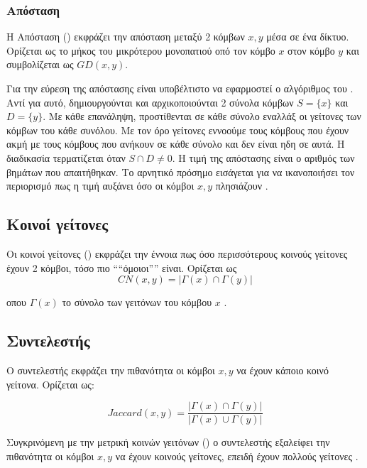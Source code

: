 \subsubsection{Απόσταση}

Η Απόσταση () εκφράζει την απόσταση μεταξύ 2 κόμβων \(x,y\) μέσα σε ένα δίκτυο.
Ορίζεται ως το μήκος του μικρότερου μονοπατιού οπό τον κόμβο
    $x$ στον κόμβο $y$ και συμβολίζεται ως $GD(x,y)$.

Για την εύρεση της απόστασης είναι υποβέλτιστο να εφαρμοστεί ο αλγόριθμος του 
 \cite{Dijkstra1959}.
Αντί για αυτό, δημιουργούνται και αρχικοποιούνται 2 σύνολα κόμβων \(S = \{x\}\) 
και \(D = \{y\}\). Με κάθε επανάληψη, προστίθενται σε κάθε σύνολο εναλλάξ οι γείτονες των 
κόμβων του κάθε συνόλου. Με τον όρο γείτονες εννοούμε τους κόμβους 
που έχουν ακμή με τους
κόμβους που ανήκουν σε κάθε σύνολο και δεν είναι ηδη σε αυτά. Η διαδικασία τερματίζεται 
όταν
\(S \cap D \neq 0\). Η τιμή της απόστασης είναι ο αριθμός των βημάτων που απαιτήθηκαν. Το
αρνητικό πρόσημο εισάγεται για να ικανοποιήσει τον περιορισμό πως η τιμή αυξάνει όσο οι 
κόμβοι \(x,y\) πλησιάζουν \cite{GraphDistance}.

\subsection{Κοινοί γείτονες}

Οι κοινοί γείτονες () εκφράζει την έννοια πως όσο περισσότερους κοινούς
γείτονες έχουν 2 κόμβοι, τόσο πιο ````όμοιοι'''' είναι. Ορίζεται ως
 \begin{equation}
     CN(x,y) = |\Gamma(x)\cap\Gamma(y)|
 \end{equation}

οπου \(\Gamma(x)\) το σύνολο των γειτόνων του κόμβου \(x\) \cite{CN}.

\subsection{Συντελεστής }

Ο συντελεστής  εκφράζει την πιθανότητα οι κόμβοι \(x,y\) να έχουν κάποιο κοινό
γείτονα. Ορίζεται ως:

\begin{equation}
    Jaccard(x,y) = \frac{|\Gamma(x)\cap\Gamma(y)|}{|\Gamma(x)\cup\Gamma(y)|}
\end{equation}

Συγκρινόμενη με την μετρική κοινών γειτόνων () ο συντελεστής  εξαλείφει
την πιθανότητα οι κόμβοι \(x,y\) να έχουν κοινούς γείτονες, επειδή έχουν πολλούς γείτονες
\cite{kosub2016note}.

